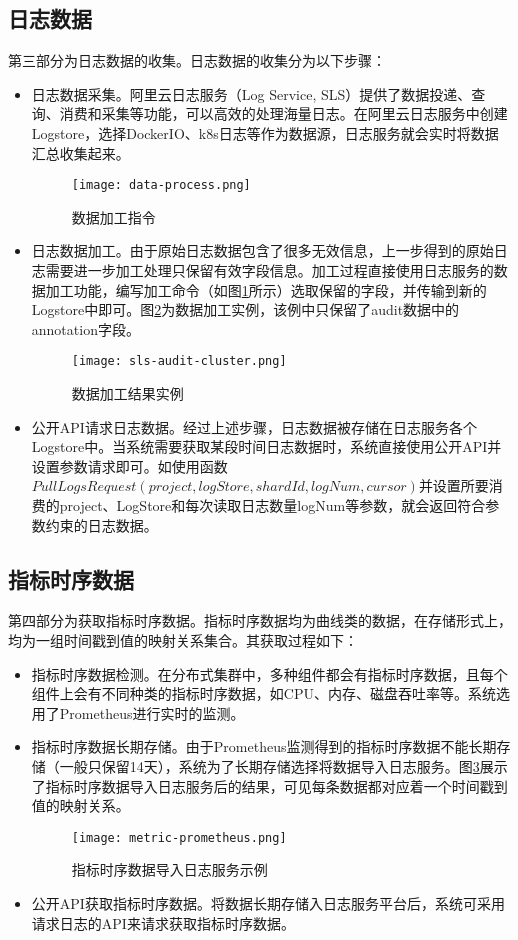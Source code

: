 \subsection{日志数据}
第三部分为日志数据的收集。日志数据的收集分为以下步骤：
\begin{itemize}
    \item [（1）]日志数据采集。阿里云日志服务（Log Service, SLS）提供了数据投递、查询、消费和采集等功能，可以高效的处理海量日志。在阿里云日志服务中创建Logstore，选择DockerIO、k8s日志等作为数据源，日志服务就会实时将数据汇总收集起来。
    \begin{figure}[htbp]
        \centering
        \texttt{[image: data-process.png]}
        \caption{数据加工指令\label{data-process}}
    \end{figure}
    \item [（2）]日志数据加工。由于原始日志数据包含了很多无效信息，上一步得到的原始日志需要进一步加工处理只保留有效字段信息。加工过程直接使用日志服务的数据加工功能，编写加工命令（如图\ref{data-process}所示）选取保留的字段，并传输到新的Logstore中即可。图\ref{sls-audit-cluster}为数据加工实例，该例中只保留了audit数据中的annotation字段。
    \begin{figure}[htbp]
        \centering
        \texttt{[image: sls-audit-cluster.png]}
        \caption{数据加工结果实例\label{sls-audit-cluster}}
    \end{figure}
    \item [（3）]公开API请求日志数据。经过上述步骤，日志数据被存储在日志服务各个Logstore中。当系统需要获取某段时间日志数据时，系统直接使用公开API并设置参数请求即可。如使用函数$PullLogsRequest(project, logStore, shardId, logNum, cursor)$并设置所要消费的project、LogStore和每次读取日志数量logNum等参数，就会返回符合参数约束的日志数据。
\end{itemize}

\subsection{指标时序数据}
第四部分为获取指标时序数据。指标时序数据均为曲线类的数据，在存储形式上，均为一组时间戳到值的映射关系集合。其获取过程如下：
\begin{itemize}
    \item [（1）]指标时序数据检测。在分布式集群中，多种组件都会有指标时序数据，且每个组件上会有不同种类的指标时序数据，如CPU、内存、磁盘吞吐率等。系统选用了Prometheus进行实时的监测。
    \item [（2）]指标时序数据长期存储。由于Prometheus监测得到的指标时序数据不能长期存储（一般只保留14天），系统为了长期存储选择将数据导入日志服务。图\ref{metric-prometheus}展示了指标时序数据导入日志服务后的结果，可见每条数据都对应着一个时间戳到值的映射关系。
    \begin{figure}[htbp]
        \centering
        \texttt{[image: metric-prometheus.png]}
        \caption{指标时序数据导入日志服务示例\label{metric-prometheus}}
    \end{figure}
    \item [（3）]公开API获取指标时序数据。将数据长期存储入日志服务平台后，系统可采用请求日志的API来请求获取指标时序数据。
\end{itemize}

